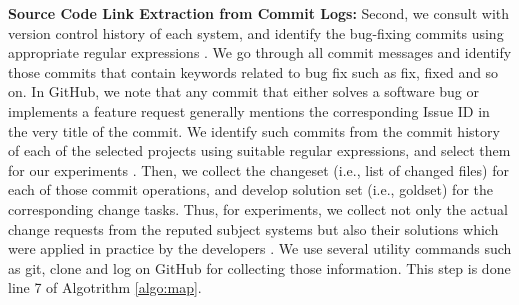 \documentclass[conference]{IEEEtran}
\let\footnotesize\scriptsize
\begin{document}



\textbf{Source Code Link Extraction from Commit Logs:}
Second, we consult with version control history of each system, and identify the bug-fixing commits using appropriate regular expressions \cite{bugid,Wang2}.
We go through all commit messages and identify those commits that contain keywords related to bug fix such as fix, fixed and so on.
In  GitHub, we  note  that any commit that either solves a software bug or implements a feature request generally mentions the corresponding Issue ID
in the very title of the commit.
We identify such commits from the commit history of each of the selected projects using suitable regular expressions, and select them for our experiments
\cite{Bachmann}. Then, we collect the changeset (i.e., list of changed files)
for each of those commit operations, and develop solution set (i.e.,
goldset) for the corresponding change tasks. Thus, for experiments, we collect not only the actual change requests from the reputed subject systems but also their solutions which were applied in practice by the developers \cite{SHaiduc}. We use several
utility commands such as git, clone and log on GitHub for collecting those information. This step is done line 7 of Algotrithm \ref{algo:map}. 
\end{document}
